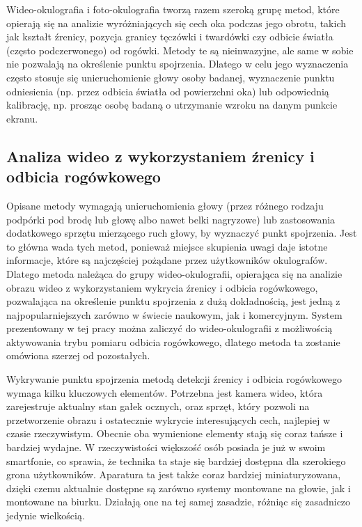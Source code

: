 \documentclass[a4paper,twoside,12pt]{book}
\begin{document}
Wideo-okulografia i foto-okulografia tworzą razem szeroką grupę metod, które opierają się na analizie wyróżniających się cech oka podczas jego obrotu, takich jak kształt źrenicy, pozycja granicy tęczówki i twardówki czy odbicie światła (często podczerwonego) od rogówki. Metody te są nieinwazyjne, ale same w sobie nie pozwalają na określenie punktu spojrzenia. Dlatego w celu jego wyznaczenia często stosuje się unieruchomienie głowy osoby badanej, wyznaczenie punktu odniesienia (np. przez odbicia światła od powierzchni oka) lub odpowiednią kalibrację, np. prosząc osobę badaną o utrzymanie wzroku na danym punkcie ekranu.

\subsection{Analiza wideo z wykorzystaniem źrenicy i odbicia rogówkowego}
\label{subsec:analiza-wideo-z-wykorzystaniem-zrenicy-i-odbicia-rogowkowego}

Opisane metody wymagają unieruchomienia głowy (przez różnego rodzaju podpórki pod brodę lub głowę albo nawet belki nagryzowe) lub zastosowania dodatkowego sprzętu mierzącego ruch głowy, by wyznaczyć punkt spojrzenia. Jest to główna wada tych metod, ponieważ miejsce skupienia uwagi daje istotne informacje, które są najczęściej pożądane przez użytkowników okulografów. Dlatego metoda należąca do grupy wideo-okulografii, opierająca się na analizie obrazu wideo z wykorzystaniem wykrycia źrenicy i odbicia rogówkowego, pozwalająca na określenie punktu spojrzenia z dużą dokładnością, jest jedną z najpopularniejszych zarówno w świecie naukowym, jak i komercyjnym. System prezentowany w tej pracy można zaliczyć do wideo-okulografii z możliwością aktywowania trybu pomiaru odbicia rogówkowego, dlatego metoda ta zostanie omówiona szerzej od pozostałych.

Wykrywanie punktu spojrzenia metodą detekcji źrenicy i odbicia rogówkowego wymaga kilku kluczowych elementów. Potrzebna jest kamera wideo, która zarejestruje aktualny stan gałek ocznych, oraz sprzęt, który pozwoli na przetworzenie obrazu i ostatecznie wykrycie interesujących cech, najlepiej w czasie rzeczywistym. Obecnie oba wymienione elementy stają się coraz tańsze i bardziej wydajne. W rzeczywistości większość osób posiada je już w swoim smartfonie, co sprawia, że technika ta staje się bardziej dostępna dla szerokiego grona użytkowników. Aparatura ta jest także coraz bardziej miniaturyzowana, dzięki czemu aktualnie dostępne są zarówno systemy montowane na głowie, jak i montowane na biurku. Działają one na tej samej zasadzie, różniąc się zasadniczo jedynie wielkością.
\end{document}
